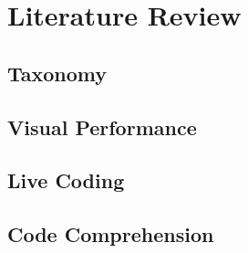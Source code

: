 
\chapter{Literature Review}
\label{cha:literaturereview}

\section{Taxonomy}
\label{sec:taxonomy}

\section{Visual Performance}
\label{sec:visualperformance}

\section{Live Coding}
\label{sec:livecoding}

\section{Code Comprehension}
\label{sec:codecomprehension}


